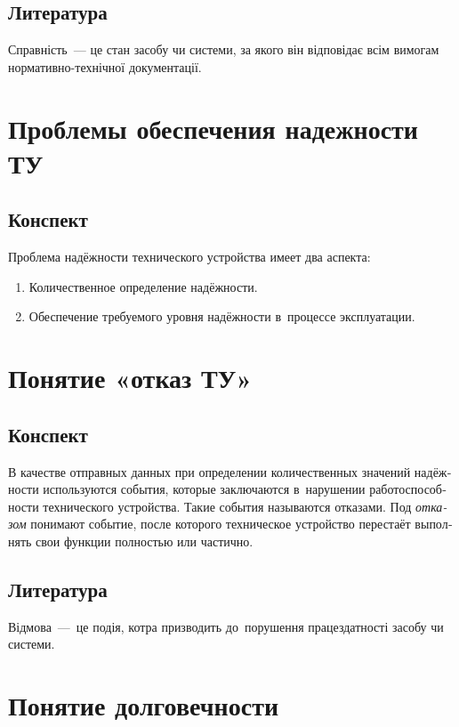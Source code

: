 \documentclass[
	a4paper,
	oneside,
	DIV = 14,
	fontsize = 14pt,
	headings = normal,
]{scrartcl}
\begin{document}
		\subsection{Литература}
			Справність~— це стан засобу чи системи, за якого він відповідає всім вимогам нормативно-технічної документації.

	\section{Проблемы обеспечения надежности ТУ}
		\subsection{Конспект}
		\begin{russian}
			Проблема надёжности технического устройства имеет два аспекта:
			\begin{enumerate}
				\item Количественное определение надёжности.
				\item Обеспечение требуемого уровня надёжности в~процессе эксплуатации.
			\end{enumerate}

		\end{russian}

	\section{Понятие «отказ ТУ»}
		\subsection{Конспект}
		\begin{russian}
			В качестве отправных данных при определении количественных значений надёжности используются события, которые заключаются в~нарушении работоспособности технического устройства. Такие события называются отказами. Под \emph{отказом} понимают событие, после которого техническое устройство перестаёт выполнять свои функции полностью или частично. 
		\end{russian}

		\subsection{Литература}
			Відмова~— це подія, котра призводить до~порушення працездатності засобу чи системи.

	\section{Понятие долговечности}
\end{document}
